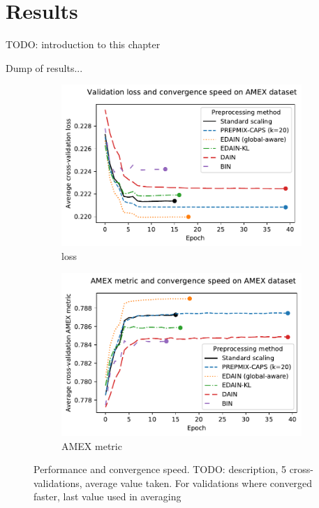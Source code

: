 \documentclass{statsmsc}
\begin{document}

\chapter{Results} %

TODO: introduction to this chapter


Dump of results...

\begin{figure}
\centering
\begin{subfigure}[b]{0.99\textwidth}
    \centering
    \includegraphics[width=\textwidth]{figures/amex_performance_convergence.pdf}
    \caption{loss}
    \label{fig:amex_performance_loss}
\end{subfigure}
\hfill
\begin{subfigure}[b]{0.99\textwidth}
    \centering
    \includegraphics[width=\textwidth]{figures/amex_performance_convergence_metric.pdf}
    \caption{AMEX metric}
    \label{fig:amex_performance_metric}
\end{subfigure}
\caption{Performance and convergence speed. TODO: description, 5 cross-validations, average
value taken. For validations where converged faster, last value used in averaging}
\label{fig:}
\end{figure}
\end{document}
